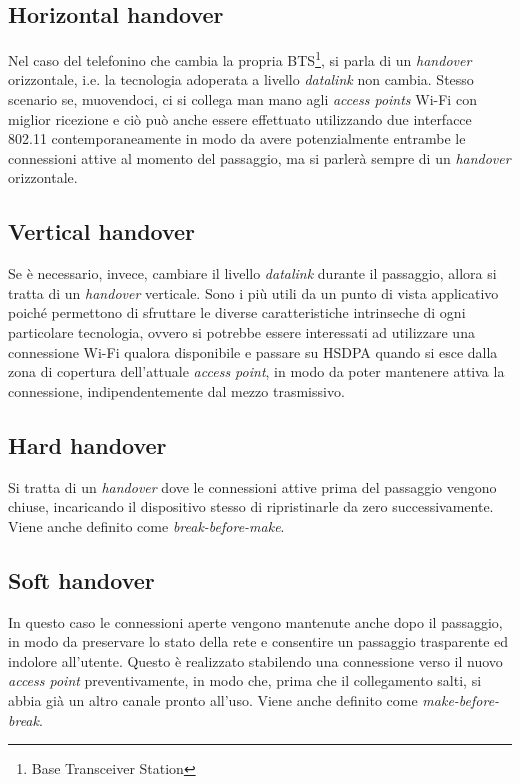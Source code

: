\subsection{Horizontal handover}
Nel caso del telefonino che cambia la propria BTS\footnote{Base Transceiver Station}, si parla di un {\em handover} orizzontale, i.e. la tecnologia adoperata a livello {\em datalink} non cambia. Stesso scenario se, muovendoci, ci si collega man mano agli {\em access points} Wi-Fi con miglior ricezione e ciò può anche essere effettuato utilizzando due interfacce 802.11 contemporaneamente in modo da avere potenzialmente entrambe le connessioni attive al momento del passaggio, ma si parlerà sempre di un {\em handover} orizzontale.

\subsection{Vertical handover}
Se è necessario, invece, cambiare il livello {\em datalink} durante il passaggio, allora si tratta di un {\em handover} verticale. Sono i più utili da un punto di vista applicativo poiché permettono di sfruttare le diverse caratteristiche intrinseche di ogni particolare tecnologia, ovvero si potrebbe essere interessati ad utilizzare una connessione Wi-Fi qualora disponibile e passare su HSDPA quando si esce dalla zona di copertura dell'attuale {\em access point}, in modo da poter mantenere attiva la connessione, indipendentemente dal mezzo trasmissivo.

\subsection{Hard handover}
Si tratta di un {\em handover} dove le connessioni attive prima del passaggio vengono chiuse, incaricando il dispositivo stesso di ripristinarle da zero successivamente. Viene anche definito come {\em break-before-make}.

\subsection{Soft handover}
In questo caso le connessioni aperte vengono mantenute anche dopo il passaggio, in modo da preservare lo stato della rete e consentire un passaggio trasparente ed indolore all'utente. Questo è realizzato stabilendo una connessione verso il nuovo {\em access point} preventivamente, in modo che, prima che il collegamento salti, si abbia già un altro canale pronto all'uso. Viene anche definito come {\em make-before-break}.

